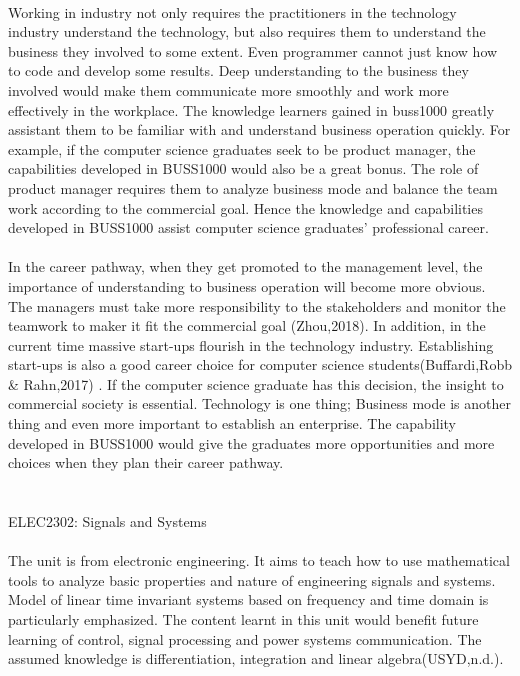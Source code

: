 \documentclass{article}
\begin{document}
	\\
	Working in industry not only requires the practitioners in the technology industry understand the technology, but also requires them to understand the business they involved to some extent. Even programmer cannot just know how to code and develop some results. Deep understanding to the business they involved would make them communicate more smoothly and work more effectively in the workplace. The knowledge learners gained in buss1000 greatly assistant them to be familiar with and understand business operation quickly. For example, if the computer science graduates seek to be product manager, the capabilities developed in BUSS1000 would also be a great bonus. The role of product manager requires them to analyze business mode and balance the team work according to the commercial goal. Hence the knowledge and capabilities developed in BUSS1000 assist computer science graduates’ professional career.\\
	\\
	In the career pathway, when they get promoted to the management level, the importance of understanding to business operation will become more obvious. The managers must take more responsibility to the stakeholders and monitor the teamwork to maker it fit the commercial goal (Zhou,2018). In addition, in the current time massive start-ups flourish in the technology industry. Establishing start-ups is also a good career choice for computer science students(Buffardi,Robb & Rahn,2017) . If the computer science graduate has this decision, the insight to commercial society is essential. Technology is one thing; Business mode is another thing and even more important to establish an enterprise. The capability developed in BUSS1000 would give the graduates more opportunities and more choices when they plan their career pathway.\\
	\\
	\\
	ELEC2302: Signals and Systems\\
	\\
	The unit is from electronic engineering. It aims to teach how to use mathematical tools to analyze basic properties and nature of engineering signals and systems. Model of linear time invariant systems based on frequency and time domain is particularly emphasized. The content learnt in this unit would benefit future learning of control, signal processing and power systems communication. The assumed knowledge is differentiation, integration and linear algebra(USYD,n.d.).\\
\end{document}
